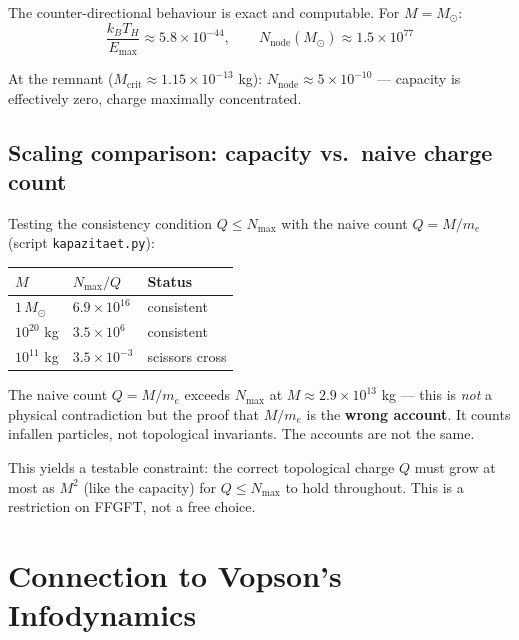 The counter-directional behaviour is exact and computable. For $M = M_\odot$:
\begin{equation}
  \frac{k_B T_H}{E_\text{max}} \approx 5.8 \times 10^{-44}, \qquad N_\text{node}(M_\odot) \approx 1.5 \times 10^{77}
\end{equation}

At the remnant ($M_\text{crit} \approx 1.15 \times 10^{-13}$ kg): $N_\text{node} \approx 5 \times 10^{-10}$ --- capacity is effectively zero, charge maximally concentrated.

\subsection{Scaling comparison: capacity vs.\ naive charge count}

Testing the consistency condition $Q \leq N_\text{max}$ with the naive count $Q = M/m_e$ (script \texttt{kapazitaet.py}):

\begin{center}
\begin{tabular}{lll}
\toprule
$M$ & $N_\text{max}/Q$ & Status \\
\midrule
$1\,M_\odot$ & $6.9 \times 10^{16}$ & consistent \\
$10^{20}$ kg & $3.5 \times 10^{6}$ & consistent \\
$10^{11}$ kg & $3.5 \times 10^{-3}$ & scissors cross \\
\bottomrule
\end{tabular}
\end{center}

\begin{wichtig}
The naive count $Q = M/m_e$ exceeds $N_\text{max}$ at $M \approx 2.9 \times 10^{13}$ kg --- this is \emph{not} a physical contradiction but the proof that $M/m_e$ is the \textbf{wrong account}. It counts infallen particles, not topological invariants. The accounts are not the same.
\end{wichtig}

This yields a testable constraint: the correct topological charge $Q$ must grow at most as $M^2$ (like the capacity) for $Q \leq N_\text{max}$ to hold throughout. This is a restriction on FFGFT, not a free choice.

\section{Connection to Vopson's Infodynamics}

